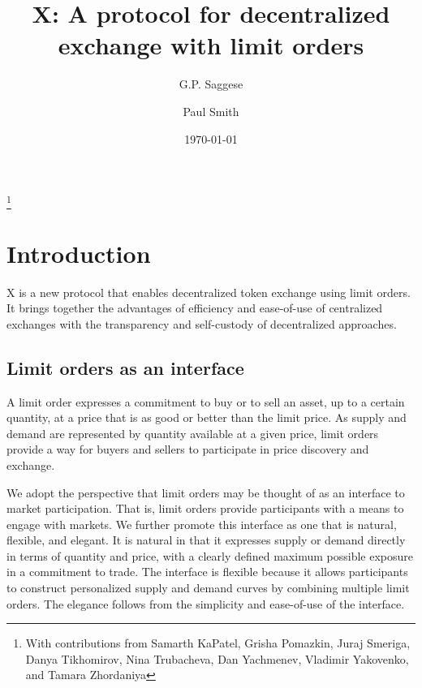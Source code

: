 \documentclass[11pt, reqno]{amsart}
\theoremstyle{definition}
\theoremstyle{remark}
\begin{document}
\title{X: A protocol for decentralized exchange with limit orders}

\author{G.P. Saggese}
\author{Paul Smith}

\thanks{With contributions from
	Samarth KaPatel,
	Grisha Pomazkin,
	Juraj Smeriga,
	Danya Tikhomirov,
	Nina Trubacheva,
	Dan Yachmenev,
	Vladimir Yakovenko,
	and
	Tamara Zhordaniya}

\date{\today}

\maketitle

\tableofcontents



\section{Introduction}

X is a new protocol that enables decentralized token exchange using limit
orders. It brings together the advantages of efficiency and ease-of-use of
centralized exchanges with the transparency and self-custody of
decentralized approaches.

\subsection{Limit orders as an interface}
A limit order expresses a commitment to buy or to sell an asset, up to
a certain quantity, at a price that is as good or better than the limit price.
As supply and demand are represented by quantity available at a given price,
limit orders provide a way for buyers and sellers to participate in price
discovery and exchange.

We adopt the perspective that limit orders may be thought of as an interface
to market participation. That is, limit orders provide participants with a
means to engage with markets. We further promote this interface as one that
is natural, flexible, and elegant. It is natural in that it expresses
supply or demand directly in terms of quantity and price, with a clearly
defined maximum possible exposure in a commitment to trade. The interface is
flexible because it allows participants to construct personalized supply and
demand curves by combining multiple limit orders. The elegance follows from the
simplicity and ease-of-use of the interface.
\end{document}
